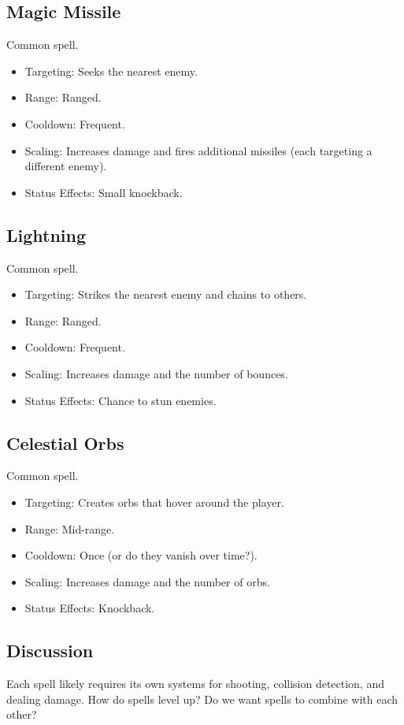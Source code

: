 \documentclass[12pt]{article}
\begin{document}
\subsection{Magic Missile}
Common spell.  
\begin{itemize}
    \item Targeting: Seeks the nearest enemy. 
    \item Range: Ranged. 
    \item Cooldown: Frequent.
    \item Scaling: Increases damage and fires additional missiles (each targeting a different enemy). 
    \item Status Effects: Small knockback. 
\end{itemize}

\subsection{Lightning}
Common spell.  
\begin{itemize}
    \item Targeting: Strikes the nearest enemy and chains to others.
    \item Range: Ranged. 
    \item Cooldown: Frequent.
    \item Scaling: Increases damage and the number of bounces.
    \item Status Effects: Chance to stun enemies.
\end{itemize}

\subsection{Celestial Orbs}
Common spell.  
\begin{itemize}
    \item Targeting: Creates orbs that hover around the player.
    \item Range: Mid-range. 
    \item Cooldown: Once (or do they vanish over time?).
    \item Scaling: Increases damage and the number of orbs.
    \item Status Effects: Knockback.
\end{itemize}

\subsection{Discussion}
Each spell likely requires its own systems for shooting, collision detection, and dealing damage.  
How do spells level up? Do we want spells to combine with each other? 
\end{document}
